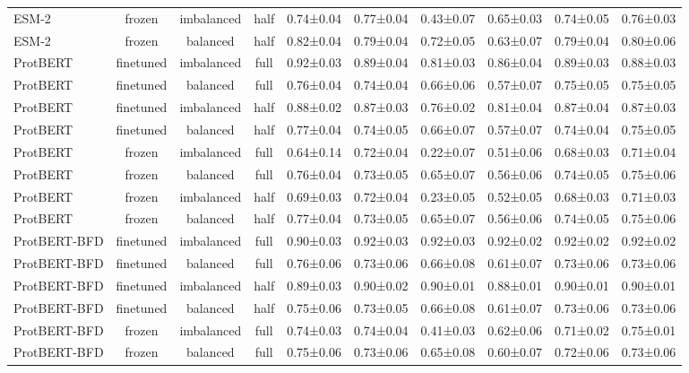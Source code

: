 \begin{tabular}{lccccccccc}
       ESM-2 &         frozen & imbalanced &      half & 0.74±0.04 & 0.77±0.04 & 0.43±0.07 & 0.65±0.03 & 0.74±0.05 & 0.76±0.03 \\
       ESM-2 &         frozen &   balanced &      half & 0.82±0.04 & 0.79±0.04 & 0.72±0.05 & 0.63±0.07 & 0.79±0.04 & 0.80±0.06 \\
    ProtBERT &      finetuned & imbalanced &      full & 0.92±0.03 & 0.89±0.04 & 0.81±0.03 & 0.86±0.04 & 0.89±0.03 & 0.88±0.03 \\
    ProtBERT &      finetuned &   balanced &      full & 0.76±0.04 & 0.74±0.04 & 0.66±0.06 & 0.57±0.07 & 0.75±0.05 & 0.75±0.05 \\
    ProtBERT &      finetuned & imbalanced &      half & 0.88±0.02 & 0.87±0.03 & 0.76±0.02 & 0.81±0.04 & 0.87±0.04 & 0.87±0.03 \\
    ProtBERT &      finetuned &   balanced &      half & 0.77±0.04 & 0.74±0.05 & 0.66±0.07 & 0.57±0.07 & 0.74±0.04 & 0.75±0.05 \\
    ProtBERT &         frozen & imbalanced &      full & 0.64±0.14 & 0.72±0.04 & 0.22±0.07 & 0.51±0.06 & 0.68±0.03 & 0.71±0.04 \\
    ProtBERT &         frozen &   balanced &      full & 0.76±0.04 & 0.73±0.05 & 0.65±0.07 & 0.56±0.06 & 0.74±0.05 & 0.75±0.06 \\
    ProtBERT &         frozen & imbalanced &      half & 0.69±0.03 & 0.72±0.04 & 0.23±0.05 & 0.52±0.05 & 0.68±0.03 & 0.71±0.03 \\
    ProtBERT &         frozen &   balanced &      half & 0.77±0.04 & 0.73±0.05 & 0.65±0.07 & 0.56±0.06 & 0.74±0.05 & 0.75±0.06 \\
ProtBERT-BFD &      finetuned & imbalanced &      full & 0.90±0.03 & 0.92±0.03 & 0.92±0.03 & 0.92±0.02 & 0.92±0.02 & 0.92±0.02 \\
ProtBERT-BFD &      finetuned &   balanced &      full & 0.76±0.06 & 0.73±0.06 & 0.66±0.08 & 0.61±0.07 & 0.73±0.06 & 0.73±0.06 \\
ProtBERT-BFD &      finetuned & imbalanced &      half & 0.89±0.03 & 0.90±0.02 & 0.90±0.01 & 0.88±0.01 & 0.90±0.01 & 0.90±0.01 \\
ProtBERT-BFD &      finetuned &   balanced &      half & 0.75±0.06 & 0.73±0.05 & 0.66±0.08 & 0.61±0.07 & 0.73±0.06 & 0.73±0.06 \\
ProtBERT-BFD &         frozen & imbalanced &      full & 0.74±0.03 & 0.74±0.04 & 0.41±0.03 & 0.62±0.06 & 0.71±0.02 & 0.75±0.01 \\
ProtBERT-BFD &         frozen &   balanced &      full & 0.75±0.06 & 0.73±0.06 & 0.65±0.08 & 0.60±0.07 & 0.72±0.06 & 0.73±0.06 \\

\end{tabular}
